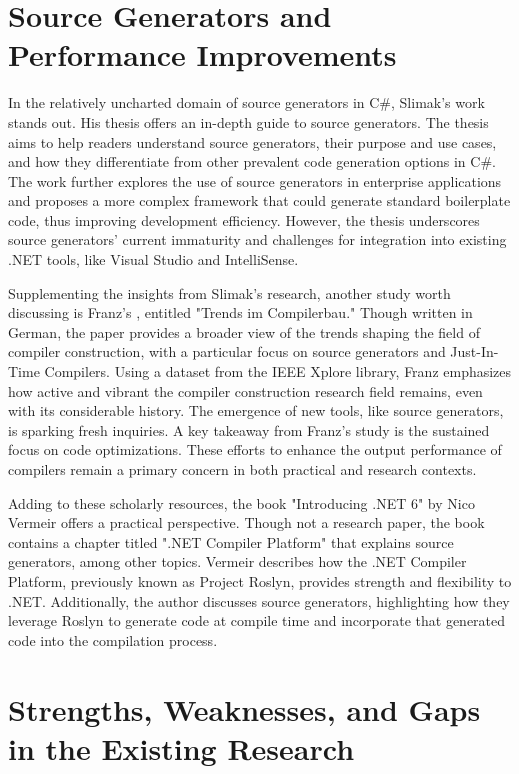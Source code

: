 \section{Source Generators and Performance Improvements}

In the relatively uncharted domain of source generators in C\#, Slimak's work \cite{Slimak2022} stands out. His thesis offers an in-depth guide to source generators. The thesis aims to help readers understand source generators, their purpose and use cases, and how they differentiate from other prevalent code generation options in C\#. The work further explores the use of source generators in enterprise applications and proposes a more complex framework that could generate standard boilerplate code, thus improving development efficiency. However, the thesis underscores source generators' current immaturity and challenges for integration into existing .NET tools, like Visual Studio and IntelliSense.

Supplementing the insights from Slimak's research, another study worth discussing is Franz's \cite{Franz2022}, entitled "Trends im Compilerbau." Though written in German, the paper provides a broader view of the trends shaping the field of compiler construction, with a particular focus on source generators and Just-In-Time Compilers. Using a dataset from the IEEE Xplore library, Franz emphasizes how active and vibrant the compiler construction research field remains, even with its considerable history. The emergence of new tools, like source generators, is sparking fresh inquiries. A key takeaway from Franz's study is the sustained focus on code optimizations. These efforts to enhance the output performance of compilers remain a primary concern in both practical and research contexts.

Adding to these scholarly resources, the book "Introducing .NET 6" by Nico Vermeir \cite{Vermeir2022} offers a practical perspective. Though not a research paper, the book contains a chapter titled ".NET Compiler Platform" that explains source generators, among other topics. Vermeir describes how the .NET Compiler Platform, previously known as Project Roslyn, provides strength and flexibility to .NET. Additionally, the author discusses source generators, highlighting how they leverage Roslyn to generate code at compile time and incorporate that generated code into the compilation process.

\section{Strengths, Weaknesses, and Gaps in the Existing Research}

